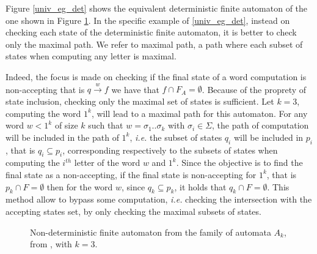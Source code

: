 \documentclass[letterpaper]{article}
\theoremstyle{definition}
\begin{document}
Figure \ref{univ_eg_det} shows the equivalent deterministic finite
automaton of the one
shown in Figure \ref{univ_eg_nondet}.
In the specific example of \ref{univ_eg_det}, instead on checking
each state of the deterministic finite automaton, it is
better to check only the maximal path.
We refer to maximal path, a path where each subset of states
when computing any letter is maximal.


Indeed, the focus
is made on checking if the final state of a word computation is
non-accepting that is $q \xrightarrow{w} f$ we have that
 $f \cap F_A = \emptyset$.
Because of the
proprety of state inclusion, checking only the
maximal set of states is sufficient. Let $k=3$, computing the word $1^k$,
will lead to a maximal path for this automaton.
For any word $w < 1^k$
of size $k$ such that $w = \sigma_1..\sigma_k$ with $\sigma_i \in \Sigma$,
the path of computation will be included in the path of $1^k$,
\textit{i.e.} the subset of states $q_i$ will be included
in $p_i$, that is $q_i \subseteq p_i$,
corresponding respectively to the subsets of states
when computing the $i^{th}$ letter of the word $w$ and $1^k$.
Since the objective is to find the final state as a non-accepting,
if the final state is non-accepting for $1^k$,
that is $p_k \cap F = \emptyset$ then for the word $w$,
since $q_k \subseteq p_k$, it holds that $q_k \cap F = \emptyset$.
This method allow to bypass some computation, \textit{i.e.}
checking the intersection with the accepting states set, by only checking
the maximal subsets of states.


\begin{figure}
    \center

    \caption{Non-deterministic finite automaton from the
    family of automata $A_k$,
    from \cite{AC_universality}, with $k=3$.}
    \label{univ_eg_nondet}


\end{figure}
\end{document}
